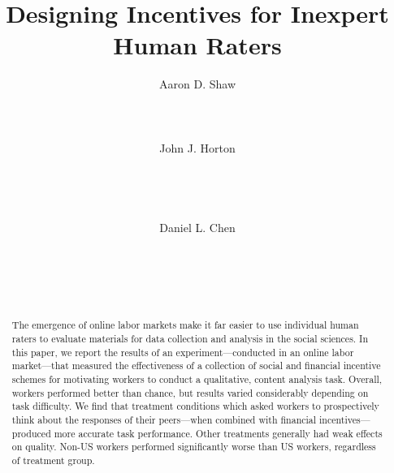\documentclass{chi2009}
\begin{document}
\setlength{\paperheight}{11in}
\setlength{\paperwidth}{8.5in}
\setlength{\pdfpageheight}{\paperheight}
\setlength{\pdfpagewidth}{\paperwidth}


\title{Designing Incentives for Inexpert Human Raters} 



\author{
\alignauthor 
Aaron D. Shaw\\
       \\
       \\
       \\
\alignauthor 
John J. Horton\\
       \\
       \\
       \\
       \\
\alignauthor 
Daniel L. Chen\\
       \\
       \\
       \\
       \\
}

\maketitle

\begin{abstract} 
The emergence of online labor markets make it far easier to use
individual human raters to evaluate materials for data collection and
analysis in the social sciences. In this paper, we report the results
of an experiment---conducted in an online labor market---that measured
the effectiveness of a collection of social and financial incentive
schemes for motivating workers to conduct a qualitative, content
analysis task. Overall, workers performed better than chance, but
results varied considerably depending on task difficulty. We find that
treatment conditions which asked workers to prospectively think about
the responses of their peers---when combined with financial
incentives---produced more accurate task performance. Other
treatments generally had weak effects on quality. Non-US workers
performed significantly worse than US workers, regardless of treatment
group.
\end{abstract}
\end{document}
